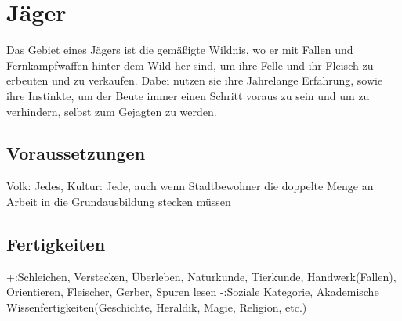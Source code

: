 \documentclass[a4paper,12pt,oneside]{book}
\begin{document}
\section{Jäger}
Das Gebiet eines Jägers ist die gemäßigte Wildnis, wo er mit Fallen und Fernkampfwaffen hinter dem Wild her sind, um ihre Felle und ihr Fleisch zu erbeuten und zu verkaufen. Dabei nutzen sie ihre Jahrelange Erfahrung, sowie ihre Instinkte, um der Beute immer einen Schritt voraus zu sein und um zu verhindern, selbst zum Gejagten zu werden.
\subsection{Voraussetzungen}
Volk: Jedes, Kultur: Jede, auch wenn Stadtbewohner die doppelte Menge an Arbeit in die Grundausbildung stecken müssen
\subsection{Fertigkeiten}
+:Schleichen, Verstecken, Überleben, Naturkunde, Tierkunde, Handwerk(Fallen), Orientieren, Fleischer, Gerber, Spuren lesen
-:Soziale Kategorie, Akademische Wissenfertigkeiten(Geschichte, Heraldik, Magie, Religion, etc.)
\end{document}
